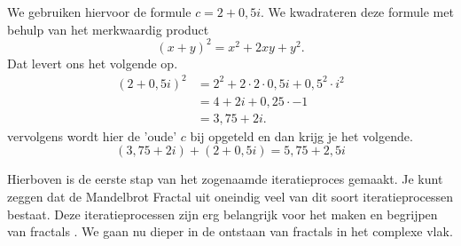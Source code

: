 \documentclass[11pt,fleqn]{book} %
\begin{document}
We gebruiken hiervoor de formule $c=2+0,5i$. We kwadrateren deze formule met behulp van het merkwaardig product
\begin{displaymath}
{\left(x+y\right)}^2=x^2+2xy+y^2.
\end{displaymath}
Dat levert ons het volgende op.
\begin{align*}
{\left(2+0,5i\right)}^2 &= 2^2+2\cdot 2\cdot 0,5i+0,5^2\cdot i^2\\
&= 4+2i+0,25\cdot -1\\
&= 3,75+2i.
\end{align*}
vervolgens wordt hier de 'oude' $c$ bij opgeteld en dan krijg je het volgende.
\begin{displaymath}
(3,75+2i)+(2+0,5i)=5,75+2,5i
\end{displaymath}

Hierboven is de eerste stap van het zogenaamde iteratieproces gemaakt. Je kunt zeggen dat de Mandelbrot Fractal uit oneindig veel van dit soort iteratieprocessen bestaat. Deze iteratieprocessen zijn erg belangrijk voor het maken en begrijpen van fractals \cite{fracmachine}. We gaan nu dieper in de ontstaan van fractals in het complexe vlak.    
\end{document}
